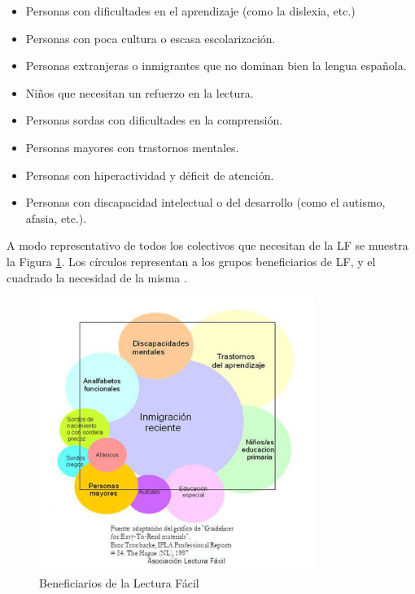 \begin{itemize}
	\item Personas con dificultades en el aprendizaje (como la dislexia, etc.)	 
	\item Personas con poca cultura o escasa escolarización.	 
	\item Personas extranjeras o inmigrantes que no dominan bien la lengua española.
	\item Niños que necesitan un refuerzo en la lectura.
	\item Personas sordas con dificultades en la comprensión.
	\item Personas mayores con trastornos mentales.
	\item Personas con hiperactividad y  déficit de atención. 
	\item Personas con discapacidad intelectual o del desarrollo (como el autismo, afasia, etc.). 
\end{itemize}
	A modo representativo de todos los colectivos que necesitan de la LF se muestra la Figura \ref{fig:destinatarios}. Los círculos representan a los grupos beneficiarios de LF, y el cuadrado la necesidad de la misma \citep{nomura2010guidelines}. 
	\begin{figure}[htb]
		\centering
		\includegraphics[width=0.8\textwidth]{Imagenes/Ejemplos/destinatarios}
		\caption{Beneficiarios de la Lectura Fácil}
		\label{fig:destinatarios}
	\end{figure}
	

	



